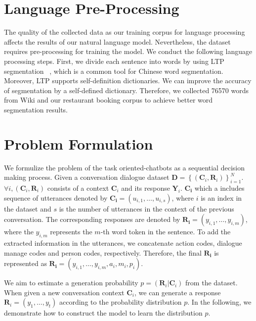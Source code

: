 \section{Language Pre-Processing}
The quality of the collected data as our training corpus for language processing affects the results of our natural language model. Nevertheless, the dataset requires pre-processing for training the model. We conduct the following language processing steps. First, we divide each sentence into words by using LTP segmentation ~\cite{LTP}, which is a common tool for Chinese word segmentation. Moreover, LTP supports self-definition dictionaries.  We can improve the accuracy of segmentation by a self-defined dictionary. Therefore, we collected 76570 words from Wiki and our restaurant booking corpus to achieve better word segmentation results. 


\section{Problem Formulation}

We formulize the problem of the task oriented-chatbots as a sequential decision making process. Given a conversation dialogue dataset $\mathbf{D} = \left\{\left(\mathbf{C}_{i}, \mathbf{R}_{i}\right)\right\}_{i=1}^{N}$. $\forall i,\left(\mathbf{C}_{i}, \mathbf{R}_{i}\right)$ consists of a context $\mathbf{C}_{i}$ and its response $\mathbf{Y}_{i}$. $\mathbf{C_{i}}$ which a includes sequence of utterances denoted by $\mathbf{C_{i}} = \left(u_{i,1}, \ldots, u_{i,s}\right)$, where $i$ is an index in the dataset and $s$ is the number of utterances in the context of the previous conversation. The corresponding responses are denoted by $\mathbf{R_{i}} = \left(y_{i,1},\ldots,y_{i,m}\right)$, where the $y_{i,m}$ represents the $m$-th word token in the sentence. To add the extracted information in the utterances, we concatenate action codes, dialogue manage codes and person codes, respectively. Therefore, the final $\mathbf{R_{i}}$ is represented as $\mathbf{R_{i}} = \left(y_{i,1},\ldots,y_{i,m},a_{i},m_{i},p_{i}\right)$.

We aim to estimate a generation probability $p = \left(\mathbf{R}_{i}|\mathbf{C}_{i} \right)$ from the dataset. When given a new conversation context $\mathbf{C}_{i}$, we can generate a response $\mathbf{R}_{i} = \left(y_{1},\ldots,y_{t}\right)$ according to the probability distribution $p$. In the following, we demonstrate how to construct the model to learn the distribution $p$.

